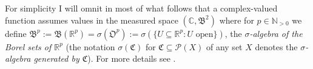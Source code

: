 \begin{remark}
	For simplicity I will omnit in most of what follows that a complex-valued function assumes values in the measured space $(\mathbb{C},\mathfrak{B}^2)$ where for $p \in \mathbb{N}_{>0}$ we define $\mathfrak{B}^p := \mathfrak{B}(\mathbb{R}^p) = \sigma(\mathfrak{O}^p) := \sigma(\{U \subseteq \mathbb{R}^p : U \text{ open}\})$, the \emph{$\sigma$-algebra of the Borel sets of $\mathbb{R}^p$} (the notation $\sigma(\mathfrak{C})$ for $\mathfrak{C} \subseteq \mathcal{P}(X)$ of any set $X$ denotes the \emph{$\sigma$-algebra generated by $\mathfrak{C}$}). For more details see \cite[16--19]{elstrodt:mass:2011}.
\end{remark}

\newpage

\newpage

\newpage


\originalsectionstyle

\appendix

\printbibliography

\printindex


